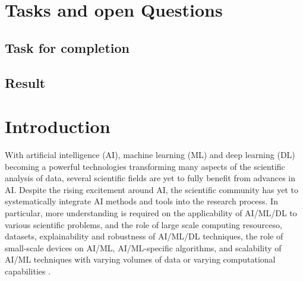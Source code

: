 \documentclass[sigplan,screen]{acmart}
\begin{document}
{\huge\bf \TITLE}


\tableofcontents

\listoffigures
\listoftables


\section{Tasks and open Questions}



\subsection{Task for completion}




\subsection{Result}






\clearpage

\maketitle

\section{Introduction}


With artificial intelligence (AI), machine learning (ML) and deep learning (DL) becoming a powerful technologies transforming many aspects of the scientific analysis of data, several scientific fields are yet to fully benefit from advances in AI. Despite the rising excitement around AI, the scientific community has yet to systematically integrate AI methods and tools into the research process. In particular, more understanding is required on the applicability of AI/ML/DL to various scientific problems, and the role of large scale computing resourceso, datasets, explainability and robustness of AI/ML/DL techniques, the role of small-scale devices on AI/ML, AI/ML-specific algorithms, and scalability of AI/ML techniques with varying volumes of data or varying computational capabilities \cite{mlcommons-benchmark-2023}. 
\end{document}
